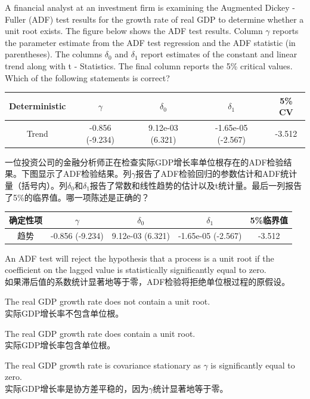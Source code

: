 \documentclass{article}
\newcounter{question} %
\begin{document}
\begin{question}
    A financial analyst at an investment firm is examining the Augmented Dickey - Fuller (ADF) test results for the growth rate of real GDP to determine whether a unit root exists. The figure below shows the ADF test results. Column $\gamma$ reports the parameter estimate from the ADF test regression and the ADF statistic (in parentheses). The columns $\delta_0$ and $\delta_1$ report estimates of the constant and linear trend along with t - Statistics. The final column reports the 5\% critical values. Which of the following statements is correct?
    \begin{center}
    \begin{tabular}{|c|c|c|c|c|}
    \hline 
    Deterministic & $\gamma$ & $\delta_0$ & $\delta_1$ & 5\% CV \\ 
    \hline 
    Trend & -0.856 (-9.234) & 9.12e-03 (6.321) & -1.65e-05 (-2.567) & -3.512 \\ 
    \hline 
    \end{tabular}
    \end{center}
    一位投资公司的金融分析师正在检查实际GDP增长率单位根存在的ADF检验结果。下图显示了ADF检验结果。列$\gamma$报告了ADF检验回归的参数估计和ADF统计量（括号内）。列$\delta_0$和$\delta_1$报告了常数和线性趋势的估计以及t统计量。最后一列报告了5\%的临界值。哪一项陈述是正确的？
    \begin{center}
        \begin{tabular}{|c|c|c|c|c|}
        \hline 
        确定性项 & $\gamma$ & $\delta_0$ & $\delta_1$ & 5\%临界值 \\ 
        \hline 
        趋势 & -0.856 (-9.234) & 9.12e-03 (6.321) & -1.65e-05 (-2.567) & -3.512 \\ 
        \hline 
        \end{tabular}
        \end{center}
    \end{question}
    
    \begin{choices}
        \item An ADF test will reject the hypothesis that a process is a unit root if the coefficient on the lagged value is statistically significantly equal to zero.\\
        如果滞后值的系数统计显著地等于零，ADF检验将拒绝单位根过程的原假设。
        \item The real GDP growth rate does not contain a unit root.\\
        实际GDP增长率不包含单位根。
        \item The real GDP growth rate does contain a unit root.\\
        实际GDP增长率包含单位根。
        \item The real GDP growth rate is covariance stationary as $\gamma$ is significantly equal to zero.\\
        实际GDP增长率是协方差平稳的，因为$\gamma$统计显著地等于零。
    \end{choices}
    
\end{document}

